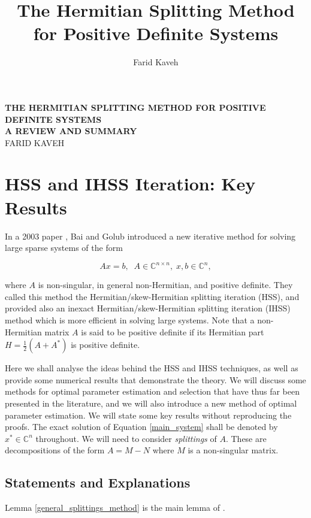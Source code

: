 \documentclass{article}
\author{Farid Kaveh}
\title{The Hermitian Splitting Method for Positive Definite Systems}
\newcommand{\bC}{\mathds{C}}
\begin{document}
  \begin{center}
      \large\textbf{THE HERMITIAN SPLITTING METHOD FOR POSITIVE DEFINITE SYSTEMS \\}
      \small\textbf{A REVIEW AND SUMMARY\\}
      \vspace{5pt}
      FARID KAVEH
  \end{center}


\section{HSS and IHSS Iteration: Key Results}
In a 2003 paper \cite{bai2003hermitian}, Bai and Golub introduced a new iterative method for solving large sparse systems of the form

\begin{equation}\label{main_system}
    Ax = b, \; \; A \in \bC^{n \times n}, \; x,b \in {\bC^n},
\end{equation}

where $A$ is non-singular, in general non-Hermitian, and positive definite. They called this method the Hermitian/skew-Hermitian splitting iteration (HSS), and provided also an inexact Hermitian/skew-Hermitian splitting iteration (IHSS) method which is more efficient in solving large systems. Note that a non-Hermitian matrix $A$ is said to be positive definite if its Hermitian part $H = \frac{1}{2}(A + A^\ast)$ is positive definite.

Here we shall analyse the ideas behind the HSS and IHSS techniques, as well as provide some numerical results that demonstrate the theory. We will discuss some methods for optimal parameter estimation and selection that have thus far been presented in the literature, and we will also introduce a new method of optimal parameter estimation. We will state some key results without reproducing the proofs. The exact solution of Equation \ref{main_system} shall be denoted by $x^\ast \in \bC^n$ throughout. We will need to consider \textit{splittings} of $A$. These are decompositions of the form $A = M - N$ where $M$ is a non-singular matrix.

\subsection{Statements and Explanations}
Lemma \ref{general_splittings_method} is the main lemma of \cite{bai2003hermitian}.
\end{document}
